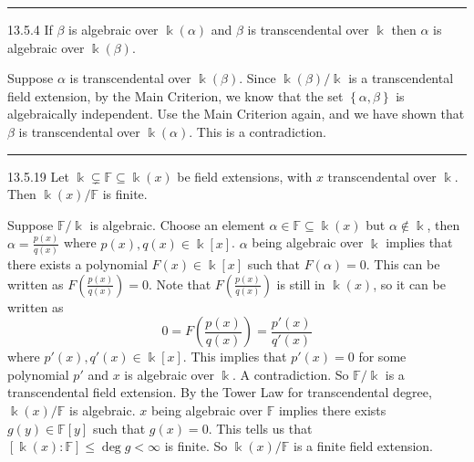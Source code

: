 \documentclass[a4paper, 12pt]{article}
\begin{document}
\noindent\rule{7in}{2.8pt}
\begin{problem}{13.5.4}
If \(\beta\) is algebraic over \(\Bbbk(\alpha)\) and \(\beta\) is transcendental over \(\Bbbk\) then \(\alpha\) is algebraic over \(\Bbbk(\beta)\).
\end{problem}
\begin{solution}
Suppose \(\alpha\) is transcendental over \(\Bbbk(\beta)\). Since \(\Bbbk(\beta)/\Bbbk\) is a transcendental field extension, by the Main Criterion, we know that the set \(\left\{ \alpha,\beta \right\}\) is algebraically independent. Use the Main Criterion again, and we have shown that \(\beta\) is transcendental over \(\Bbbk(\alpha)\). This is a contradiction.
\end{solution}

\noindent\rule{7in}{2.8pt}
\begin{problem}{13.5.19}
Let \(\Bbbk \subsetneq\mathbb{F}\subseteq\Bbbk(x)\) be field extensions, with \(x\) transcendental over \(\Bbbk\). Then \(\Bbbk(x)/\mathbb{F}\) is finite. 
\end{problem}
\begin{solution}
Suppose \(\mathbb{F}/\Bbbk\) is algebraic. Choose an element \(\alpha\in \mathbb{F}\subseteq \Bbbk(x)\) but \(\alpha\notin \Bbbk\), then \(\alpha=\frac{p(x)}{q(x)}\) where \(p(x),q(x)\in \Bbbk[x]\). \(\alpha\) being algebraic over \(\Bbbk\) implies that there exists a polynomial \(F(x)\in \Bbbk[x]\) such that \(F(\alpha)=0\). This can be written as \(F(\frac{p(x)}{q(x)})=0\). Note that \(F(\frac{p(x)}{q(x)})\) is still in \(\Bbbk(x)\), so it can be written as 
\[0=F(\frac{p(x)}{q(x)})=\frac{p'(x)}{q'(x)}\]
where \(p'(x),q'(x)\in \Bbbk[x]\). This implies that \(p'(x)=0\) for some polynomial \(p'\) and \(x\) is algebraic over \(\Bbbk\). A contradiction. So \(\mathbb{F}/\Bbbk\) is a transcendental field extension. By the Tower Law for transcendental degree, \(\Bbbk(x)/\mathbb{F}\) is algebraic. \(x\) being algebraic over \(\mathbb{F}\) implies there exists \(g(y)\in \mathbb{F}[y]\) such that \(g(x)=0\). This tells us that \([\Bbbk(x):\mathbb{F}]\leq\deg g<\infty\) is finite. So \(\Bbbk(x)/\mathbb{F}\) is a finite field extension.

\end{solution}
\end{document}
